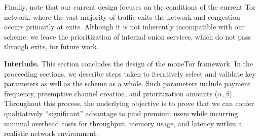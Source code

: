 Finally, note that our current design focuses on the conditions of the current Tor network, where the vast majority of traffic exits the network and congestion occurs primarily at exits.
Although it is not inherently incompatible with our scheme, we leave the prioritization of internal onion services, which do not pass through exits, for future work.

\medskip \noindent \textbf{Interlude.}
This section concludes the design of the moneTor framework.
In the proceeding sections, we describe steps taken to iteratively select and validate key parameters as well as the scheme as a whole.
Such parameters include payment frequency, preemptive channel creation, and prioritization amounts ($\alpha, \beta$).
Throughout this process, the underlying objective is to prove that we can confer qualitatively ``significant'' advantage to paid premium users while incurring minimal overhead costs for throughput, memory usage, and latency within a realistic network environment.

